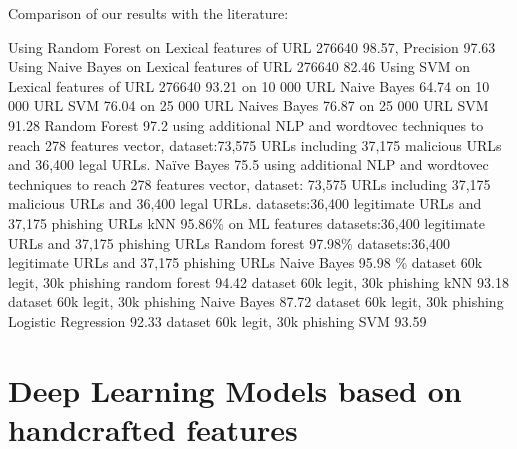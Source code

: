 \documentclass{article}
\begin{document}

    Comparison of our results with the literature:

    \cite{LexicalFeatureSelection} Using Random Forest on Lexical features of URL 276640 98.57, Precision 97.63%
    \cite{LexicalFeatureSelection} Using Naive Bayes on Lexical features of URL 276640 82.46
    \cite{LexicalFeatureSelection} Using SVM on Lexical features of URL 276640 93.21
    \cite[]{PhishSafe} on 10 000 URL Naive Bayes 64.74
    \cite[]{PhishSafe} on 10 000 URL SVM 76.04
    \cite[]{PhishSafe} on 25 000 URL Naives Bayes 76.87
    \cite[]{PhishSafe} on 25 000 URL SVM 91.28
    \cite{NLPPhishingURLDetection} Random Forest 97.2 using additional NLP and wordtovec techniques to reach 278 features vector, dataset:73,575 URLs including 37,175 malicious URLs and 36,400 legal URLs.
    \cite{NLPPhishingURLDetection} Naïve Bayes 75.5 using additional NLP and wordtovec techniques to reach 278 features vector, dataset: 73,575 URLs including 37,175 malicious URLs and 36,400 legal URLs.
    \cite{PhishingURLDetection} datasets:36,400 legitimate URLs and 37,175 phishing URLs kNN 95.86\% on ML features
    \cite{PhishingURLDetection} datasets:36,400 legitimate URLs and 37,175 phishing URLs Random forest 97.98\%
    \cite{PhishingURLDetection} datasets:36,400 legitimate URLs and 37,175 phishing URLs Naive Bayes 95.98 \%
    \cite{PhishingLoginURLDetection} dataset 60k legit, 30k phishing random forest 94.42
    \cite{PhishingLoginURLDetection} dataset 60k legit, 30k phishing kNN 93.18
    \cite{PhishingLoginURLDetection} dataset 60k legit, 30k phishing Naive Bayes 87.72
    \cite{PhishingLoginURLDetection} dataset 60k legit, 30k phishing Logistic Regression 92.33
    \cite{PhishingLoginURLDetection} dataset 60k legit, 30k phishing SVM 93.59


    \section{Deep Learning Models based on handcrafted features}\label{sec:deep-learning-models}
\end{document}
